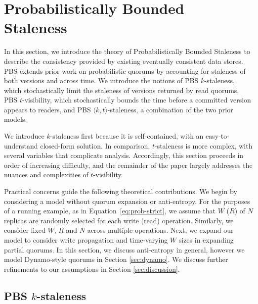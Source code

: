 \documentclass{vldb}
\newcommand{\sectionskip}{-0em}
\newcommand{\subsectionskip}{-0em}
\begin{document}
\vspace{\sectionskip}\section{Probabilistically Bounded\\Staleness}
\label{sec:pbs}

In this section, we introduce the theory of Probabilistically Bounded
Staleness to describe the consistency provided by existing eventually
consistent data stores.  PBS extends prior work on
probabilistic quorums by accounting for staleness of both versions and
across time.  We introduce the notions of PBS $k$-staleness, which
stochastically limit the staleness of versions returned by read
quorums, PBS $t$-visibility, which stochastically bounds the time
before a committed version appears to readers, and PBS $\langle k,
t \rangle$-staleness, a combination of the two prior models.

We introduce $k$-staleness first because it is self-contained, with an
easy-to-understand closed-form solution.  In comparison, $t$-staleness
is more complex, with several variables that complicate analysis.
Accordingly, this section proceeds in order of increasing difficulty,
and the remainder of the paper largely addresses the nuances and
complexities of $t$-visibility.

Practical concerns guide the following theoretical contributions.  We
begin by considering a model without quorum expansion or anti-entropy.
For the purposes of a running example, as in
Equation~\ref{eq:prob-strict}, we assume that $W$ ($R$) of $N$
replicas are randomly selected for each write (read) operation.
Similarly, we consider fixed $W$, $R$ and $N$ across multiple
operations. Next, we expand our model to consider write propagation
and time-varying $W$ sizes in expanding partial quorums.  In this
section, we discuss anti-entropy in general, however we model
Dynamo-style quorums in Section \ref{sec:dynamo}. We discuss further
refinements to our assumptions in Section \ref{sec:discussion}.

\vspace{\subsectionskip}\subsection{PBS $k$-staleness}
\label{sec:kstale}
\end{document}
